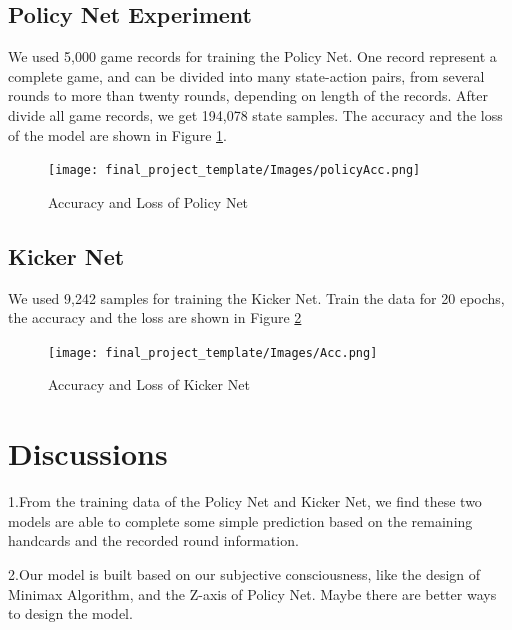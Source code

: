 \documentclass{article}
\begin{document}
\subsection{Policy Net Experiment}

We used 5,000 game records for training the Policy Net. One record represent a complete game, and can be divided into many state-action pairs, from several rounds to more than twenty rounds, depending on length of the records. After divide all game records, we get 194,078 state samples. The accuracy and the loss of the model are shown in Figure \ref{policyAcc}.
\graphicspath{{Images/}}
\maketitle
\begin{figure}[htp]
    \caption{Accuracy and Loss of Policy Net} \label{policyAcc}
    \centering 
    \texttt{[image: final\_project\_template/Images/policyAcc.png]}
\end{figure}

\subsection{Kicker Net}

We used 9,242 samples for training the Kicker Net. Train the data for 20 epochs, the accuracy and the loss are shown in Figure \ref{kickerAcc}

\graphicspath{{Images/}}
\maketitle
\begin{figure}[htp]
    \caption{Accuracy and Loss of Kicker Net} \label{kickerAcc}
    \centering 
    \texttt{[image: final\_project\_template/Images/Acc.png]}
\end{figure}

\section{Discussions}

1.From the training data of the Policy Net and Kicker Net, we find these two models are able to complete some simple prediction based on the remaining handcards and the recorded round information.

2.Our model is built based on our subjective consciousness, like the design of Minimax Algorithm, and the Z-axis of Policy Net. Maybe there are better ways to design the model.
\end{document}
